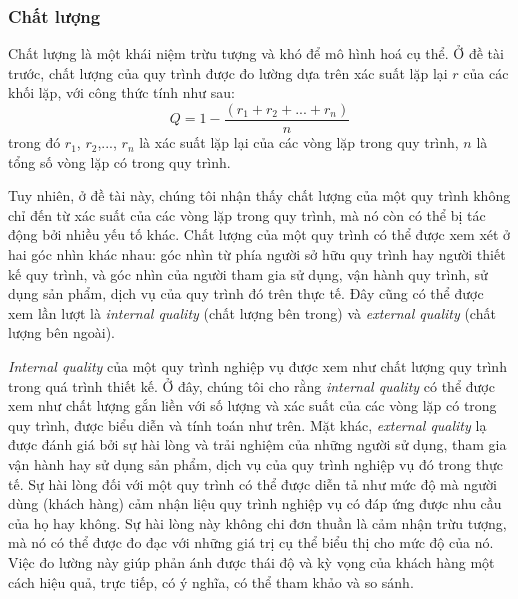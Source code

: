 \subsubsection{Chất lượng}
Chất lượng là một khái niệm trừu tượng và khó để mô hình hoá cụ thể. Ở đề tài trước, chất lượng của quy trình được đo lường dựa trên xác suất lặp lại $r$ của các khối lặp, với công thức tính như sau:
\[ Q = 1 - \frac{(r_1 + r_2 + ... + r_n)}{n}\]
trong đó $r_1$, $r_2$,..., $r_n$ là xác suất lặp lại của các vòng lặp trong quy trình, $n$ là tổng số vòng lặp có trong quy trình.
\par
Tuy nhiên, ở đề tài này, chúng tôi nhận thấy chất lượng của một quy trình không chỉ đến từ xác suất của các vòng lặp trong quy trình, mà nó còn có thể bị tác động bởi nhiều yếu tố khác. Chất lượng của một quy trình có thể được xem xét ở hai góc nhìn khác nhau: góc nhìn từ phía người sở hữu quy trình hay người thiết kế quy trình, và góc nhìn của người tham gia sử dụng, vận hành quy trình, sử dụng sản phẩm, dịch vụ của quy trình đó trên thực tế. Đây cũng có thể được xem lần lượt là \emph{internal quality} (chất lượng bên trong) và \emph{external quality} (chất lượng bên ngoài). 
\par
\emph{Internal quality} của một quy trình nghiệp vụ được xem như chất lượng quy trình trong quá trình thiết kế. Ở đây, chúng tôi cho rằng \emph{internal quality} có thể được xem như chất lượng gắn liền với số lượng và xác suất của các vòng lặp có trong quy trình, được biểu diễn và tính toán như trên. Mặt khác, \emph{external quality} lạ được đánh giá bởi sự hài lòng và trải nghiệm của những người sử dụng, tham gia vận hành hay sử dụng sản phẩm, dịch vụ của quy trình nghiệp vụ đó trong thực tế. Sự hài lòng đối với một quy trình có thể được diễn tả như mức độ mà người dùng (khách hàng) cảm nhận liệu quy trình nghiệp vụ có đáp ứng được nhu cầu của họ hay không. Sự hài lòng này không chi đơn thuần là cảm nhận trừu tượng, mà nó có thể được đo đạc với những giá trị cụ thể biểu thị cho mức độ của nó. Việc đo lường này giúp phản ánh được thái độ và kỳ vọng của khách hàng một cách hiệu quả, trực tiếp, có ý nghĩa, có thể tham khảo và so sánh. 

